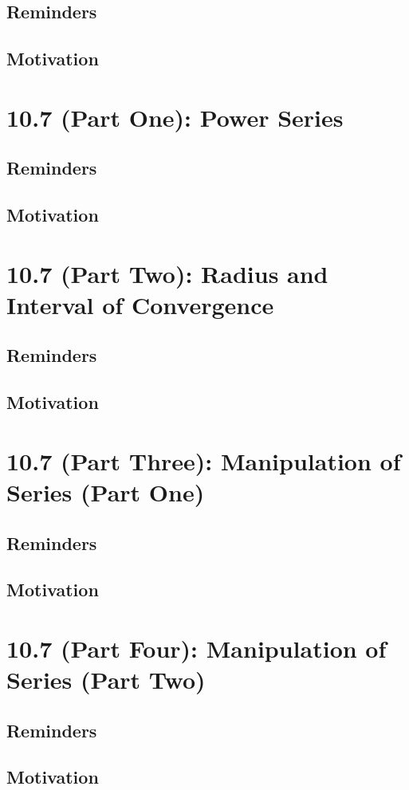 \documentclass{report}
\begin{document}
\begin{sloppypar}
\section{Reminders}
\section{Motivation}

\chapter{10.7 (Part One): Power Series}
\section{Reminders}
\section{Motivation}
\chapter{10.7 (Part Two): Radius and Interval of Convergence}
\section{Reminders}
\section{Motivation}
\chapter{10.7 (Part Three): Manipulation of Series (Part One)}
\section{Reminders}
\section{Motivation}
\chapter{10.7 (Part Four): Manipulation of Series (Part Two)}
\section{Reminders}
\section{Motivation}

\end{sloppypar}
\end{document}

